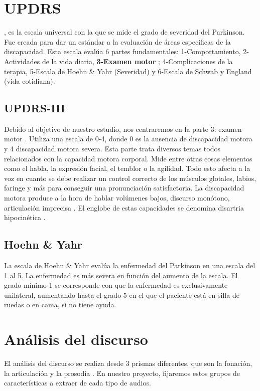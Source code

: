 \section{UPDRS}
 \cite{updrs},  es la escala universal con la que se mide el grado de severidad del Parkinson. Fue creada para dar un estándar a la evaluación de áreas específicas de la discapacidad. Esta escala evalúa 6 partes fundamentales: 1-Comportamiento, 2-Actividades de la vida diaria, \textbf{3-Examen motor} \cite{updrs3}; 4-Complicaciones de la terapia, 5-Escala de Hoehn \& Yahr (Severidad) \cite{hoehn1967} y 6-Escala de Schwab y England (vida cotidiana).\\
\subsection{UPDRS-III}
Debido al objetivo de nuestro estudio, nos centraremos en la parte 3: examen motor \cite{updrs3}. Utiliza una escala de 0-4, donde 0 es la ausencia de discapacidad motora y 4 discapacidad motora severa. Esta parte trata diversos temas todos relacionados con la capacidad motora corporal. Mide entre otras cosas elementos como el habla, la expresión facial, el temblor o la agilidad. Todo esto afecta a la voz en cuanto se debe realizar un control correcto de los músculos glotales, labios, faringe y más para conseguir una pronunciación satisfactoria. La discapacidad motora  produce a la hora de hablar volúmenes bajos, discurso monótono, articulación imprecisa \cite{Orz2016}. El englobe de estas capacidades se denomina disartria hipocinética \cite{disartia}.

\subsection{Hoehn \& Yahr}
La escala de Hoehn \& Yahr \cite{hoehn1967} evalúa la enfermedad del Parkinson en una escala del 1 al 5. La enfermedad es más severa en función del aumento de la escala. El grado mínimo 1 se corresponde con que la enfermedad es exclusivamente unilateral, aumentando hasta el grado 5 en el que el paciente está en silla de ruedas o en cama, si no tiene ayuda.

\section{Análisis del discurso}
El análisis del discurso se realiza desde 3 prismas diferentes, que son la fonación, la articulación y la prosodia \cite{speechAnalysis}. En nuestro proyecto, fijaremos estos grupos de características a extraer de cada tipo de audios.

